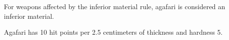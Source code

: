 For weapons affected by the inferior material rule, agafari is considered an inferior material.

Agafari has 10 hit points per 2.5 centimeters of thickness and hardness 5.







